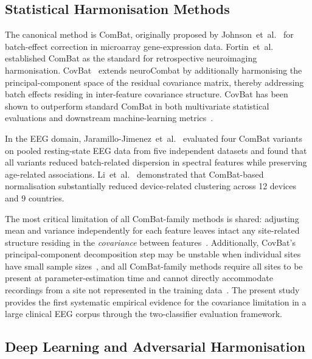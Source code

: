 \documentclass[preprint,12pt]{elsarticle}
\begin{document}
\subsection{Statistical Harmonisation Methods}
\label{subsec:statistical_harmonisation}

The canonical method is ComBat, originally proposed by
Johnson~et~al.~\cite{johnson2007adjusting} for batch-effect
correction in microarray gene-expression data.
Fortin~et~al.~\cite{fortin2017harmonization,fortin2018cortical}
established ComBat as the standard for retrospective neuroimaging
harmonisation.
CovBat~\cite{hu2023image} extends neuroCombat by additionally
harmonising the principal-component space of the residual covariance
matrix, thereby addressing batch effects residing in inter-feature
covariance structure.
CovBat has been shown to outperform standard ComBat in both
multivariate statistical evaluations and downstream machine-learning
metrics~\cite{hu2023image}.

In the EEG domain, Jaramillo-Jimenez~et~al.~\cite{jaramillo2024combat}
evaluated four ComBat variants on pooled resting-state EEG data from
five independent datasets and found that all variants reduced
batch-related dispersion in spectral features while preserving
age-related associations.
Li~et~al.~\cite{li2022harmnqeeg} demonstrated that ComBat-based
normalisation substantially reduced device-related clustering across
12 devices and 9 countries.

The most critical limitation of all ComBat-family methods is shared:
adjusting mean and variance independently for each feature leaves
intact any site-related structure residing in the \emph{covariance}
between features~\cite{hu2023image}.
Additionally, CovBat's principal-component decomposition step may be
unstable when individual sites have small sample
sizes~\cite{hu2023image}, and all ComBat-family methods require all
sites to be present at parameter-estimation time and cannot directly
accommodate recordings from a site not represented in the training
data~\cite{johnson2007adjusting}.
The present study provides the first systematic empirical evidence for
the covariance limitation in a large clinical EEG corpus through the
two-classifier evaluation framework.

\subsection{Deep Learning and Adversarial Harmonisation}
\label{subsec:dann_related}
\end{document}
